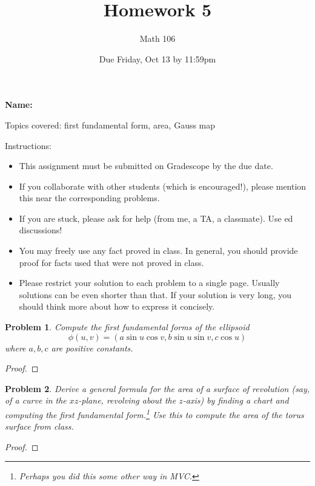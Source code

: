 \documentclass[11pt]{article}
\author{Math 106}
\date{Due Friday, Oct 13 by 11:59pm}
\title{Homework 5}
\newtheorem{problem}{Problem}
\begin{document}
\maketitle

{\bf\Large Name:} 


\vspace{.3in}
Topics covered: first fundamental form, area, Gauss map

Instructions: 
\begin{itemize}
\item This assignment must be submitted on Gradescope by the due date. 
\item If you collaborate with other students (which is encouraged!), please mention this near the corresponding problems. 
\item If you are stuck, please ask for help (from me, a TA, a classmate). Use ed discussions!  
\item You may freely use any fact proved in class. In general, you should provide proof for facts used that were not proved in class. 
\item Please restrict your solution to each problem to a single page. Usually solutions can be even shorter than that. If your solution is very long, you should think more about how to express it concisely.
\end{itemize}
\pagebreak 





\begin{problem}
Compute the first fundamental forms of the ellipsoid 
\[\phi(u,v)=(a\sin u\cos v,b\sin u\sin v,c\cos u)\]
where $a,b,c$ are positive constants.
\end{problem}

\begin{proof}

\end{proof}

\pagebreak

\begin{problem}
Derive a general formula for the area of a surface of revolution (say, of a curve in the $xz$-plane, revolving about the $z$-axis) by finding a chart and computing the first fundamental form.\footnote{Perhaps you did this some other way in MVC.} Use this to compute the area of the torus surface from class. 
\end{problem}

\begin{proof}

\end{proof}
\end{document}
